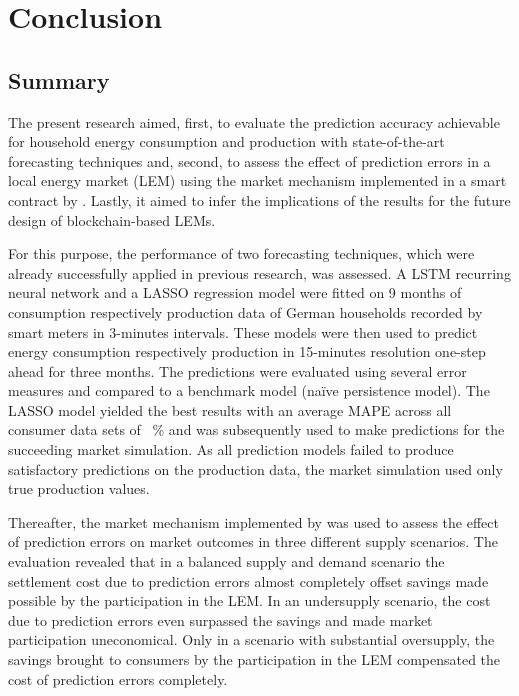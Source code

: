 
\section{Conclusion}\label{Sec:Conc}




\subsection{Summary}\label{Sec:Conclusion;Subsec:Summary}

The present research aimed, first, to evaluate the prediction accuracy achievable for household energy consumption and production with state-of-the-art forecasting techniques and, second, to assess the effect of prediction errors in a local energy market (LEM) using the market mechanism implemented in a smart contract by \citet{Mengelkamp:2018a}. Lastly, it aimed to infer the implications of the results for the future design of blockchain-based LEMs.

For this purpose, the performance of two forecasting techniques, which were already successfully applied in previous research, was assessed. A LSTM recurring neural network and a LASSO regression model were fitted on 9 months of consumption respectively production data of German households recorded by smart meters in 3-minutes intervals. These models were then used to predict energy consumption respectively production in 15-minutes resolution one-step ahead for three months. The predictions were evaluated using several error measures and compared to a benchmark model (na\"ive persistence model). The LASSO model yielded the best results with an average MAPE across all consumer data sets of ~\% and was subsequently used to make predictions for the succeeding market simulation. As all prediction models failed to produce satisfactory predictions on the production data, the market simulation used only true production values.

Thereafter, the market mechanism implemented by \citet{Mengelkamp:2018a} was used to assess the effect of prediction errors on market outcomes in three different supply scenarios. The evaluation revealed that in a balanced supply and demand scenario the settlement cost due to prediction errors almost completely offset savings made possible by the participation in the LEM. In an undersupply scenario, the cost due to prediction errors even surpassed the savings and made market participation uneconomical. Only in a scenario with substantial oversupply, the savings brought to consumers by the participation in the LEM compensated the cost of prediction errors completely.

